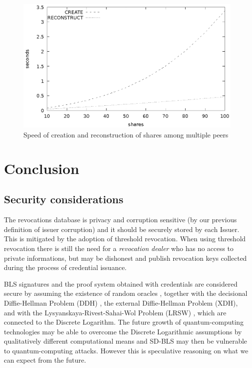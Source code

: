 \begin{figure}
    \centering
    \includegraphics[width=1\linewidth]{pvss.eps}
    \caption{Speed of creation and reconstruction of shares among multiple peers}
    \label{fig:pvss}
\end{figure}



\section{Conclusion}
\subsection{Security considerations}

The revocations database is privacy and corruption sensitive (by our
previous definition of issuer corruption) and it should be securely
stored by each Issuer. This is mitigated by the adoption of threshold
revocation. When using threshold revocation there is still the need
for a \textit{revocation dealer} who has no access to private
informations, but may be dishonest and publish revocation keys
collected during the process of credential issuance.

BLS signatures and the proof system obtained with credentials are
considered secure by assuming the existence of random oracles
\cite{random-oracle}, together with the decisional Diffie-Hellman
Problem (DDH) \cite{DDH-problem}, the external Diffie-Hellman Problem
(XDH), and with the Lysyanskaya-Rivest-Sahai-Wol Problem (LRSW)
\cite{lrsw-assumption}, which are connected to the Discrete
Logarithm. The future growth of quantum-computing technologies may be
able to overcome the Discrete Logarithmic assumptions by qualitatively
different computational means and SD-BLS may then be vulnerable to
quantum-computing attacks. However this is speculative reasoning on
what we can expect from the future.

